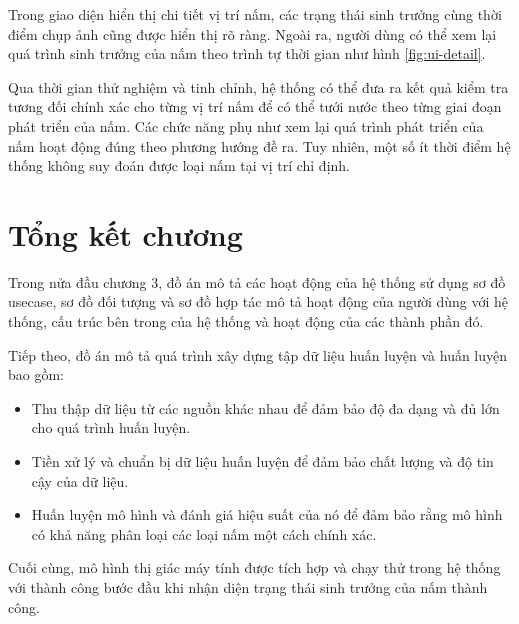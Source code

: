 Trong giao diện hiển thị chi tiết vị trí nấm, các trạng thái sinh trưởng cùng thời điểm chụp ảnh cũng được hiển thị rõ ràng. Ngoài ra, người dùng có thể xem lại quá trình sinh trưởng của nấm theo trình tự thời gian như hình \ref{fig:ui-detail}.

Qua thời gian thử nghiệm và tinh chỉnh, hệ thống có thể đưa ra kết quả kiểm tra tương đối chính xác cho từng vị trí nấm để có thể tưới nước theo từng giai đoạn phát triển của nấm. Các chức năng phụ như xem lại quá trình phát triển của nấm hoạt động đúng theo phương hướng đề ra. Tuy nhiên, một số ít thời điểm hệ thống không suy đoán được loại nấm tại vị trí chỉ định.

\section{Tổng kết chương}

Trong nửa đầu chương 3, đồ án mô tả các hoạt động của hệ thống sử dụng sơ đồ usecase, sơ đồ đối tượng và sơ đồ hợp tác mô tả hoạt động của người dùng với hệ thống, cấu trúc bên trong của hệ thống và hoạt động của các thành phần đó.

Tiếp theo, đồ án mô tả quá trình xây dựng tập dữ liệu huấn luyện và huấn luyện bao gồm:
\begin{itemize}
    \item Thu thập dữ liệu từ các nguồn khác nhau để đảm bảo độ đa dạng và đủ lớn cho quá trình huấn luyện.
    \item Tiền xử lý và chuẩn bị dữ liệu huấn luyện để đảm bảo chất lượng và độ tin cậy của dữ liệu.
    \item Huấn luyện mô hình và đánh giá hiệu suất của nó để đảm bảo rằng mô hình có khả năng phân loại các loại nấm một cách chính xác.
\end{itemize}

Cuối cùng, mô hình thị giác máy tính được tích hợp và chạy thử trong hệ thống với thành công bước đầu khi nhận diện trạng thái sinh trưởng của nấm thành công.